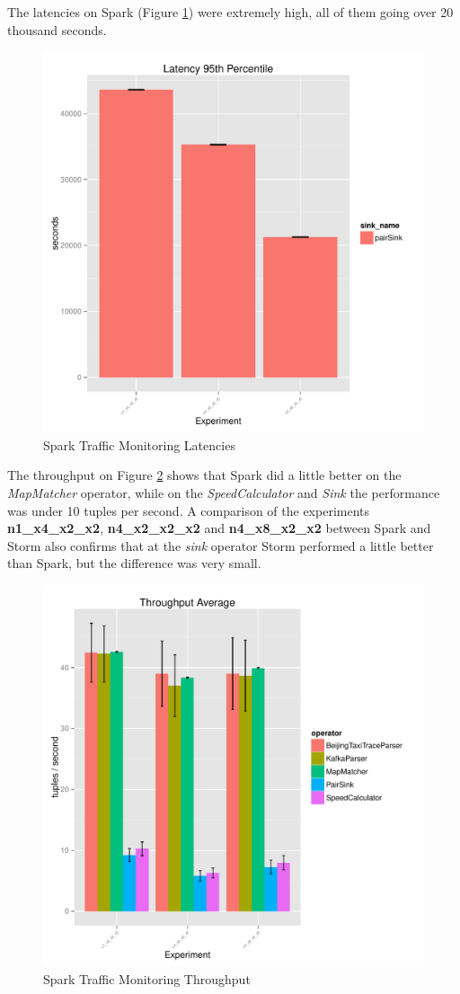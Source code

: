\documentclass[ppgc,diss,english]{iiufrgs}
\begin{document}
The latencies on Spark (Figure \ref{fig:spark_trafficmonitoring_latency}) were extremely high, all of them going over 20 thousand seconds.

\begin{figure}[H]
    \centering
	\includegraphics[width=.6\textwidth]{summaries/spark_trafficmonitoring/latency.pdf}
	\caption{Spark Traffic Monitoring Latencies}
	\label{fig:spark_trafficmonitoring_latency}
\end{figure}

The throughput on Figure \ref{fig:spark_trafficmonitoring_throughput} shows that Spark did a little better on the \textit{MapMatcher} operator, while on the \textit{SpeedCalculator} and \textit{Sink} the performance was under 10 tuples per second. A comparison of the experiments \textbf{n1\_x4\_x2\_x2}, \textbf{n4\_x2\_x2\_x2} and \textbf{n4\_x8\_x2\_x2} between Spark and Storm also confirms that at the \textit{sink} operator Storm performed a little better than Spark, but the difference was very small.

\begin{figure}[H]
    \centering
	\includegraphics[width=.6\textwidth]{summaries/spark_trafficmonitoring/throughput.pdf}
	\caption{Spark Traffic Monitoring Throughput}
	\label{fig:spark_trafficmonitoring_throughput}
\end{figure}
\end{document}
